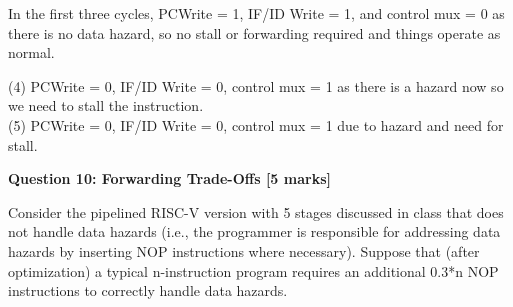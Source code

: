 \documentclass[addpoints]{exam}
\begin{document}
\begin{sloppypar}
\begin{questions}
\begin{parts}
\begin{solution}
            In the first three cycles, PCWrite = 1, IF/ID Write = 1, and control mux = 0 as there is no data hazard, so no stall or forwarding required and things operate as normal. 

            (4) PCWrite = 0, IF/ID Write = 0, control mux = 1 as there is a hazard now so we need to stall the instruction. \\ 
            (5) PCWrite = 0, IF/ID Write = 0, control mux = 1 due to hazard and need for stall.
        \end{solution}
    \end{parts}

    \question[5]
    \begin{center}
        \textbf{Question 10: Forwarding Trade-Offs [5 marks]}
    \end{center}

    Consider the pipelined RISC-V version with 5 stages discussed in class that does not handle data hazards (i.e., the programmer is responsible for addressing data hazards by inserting NOP instructions where necessary). Suppose that (after optimization) a typical n-instruction program requires an additional 0.3*n NOP instructions to correctly handle data hazards.

\end{questions}
\end{sloppypar}
\end{document}
